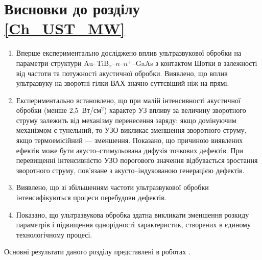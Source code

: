 \documentclass[a4paper,14pt,oneside,openany]{memoir}
\begin{document}
\section*{Висновки до розділу \ref{Ch_UST_MW}}
  \begin{enumerate}
     \item Вперше експериментально досліджено вплив ультразвукової обробки на параметри структури Au--TiB$_x$--$n$--$n^+$--GaAs з контактом Шотки
 в залежності від частоти та потужності акустичної обробки.
Виявлено, що вплив ультразвуку на зворотні гілки ВАХ значно суттєвіший ніж на прямі.

\item Експериментально встановлено, що при малій інтенсивності акустичної обробки (менше 2,5~Вт/см$^2$) характер УЗ впливу за величину зворотного струму залежить від механізму перенесення заряду:
  якщо домінуючим механізмом є тунельний, то УЗО викликає зменшення зворотного струму, якщо термоемісійний --- зменшення.
  Показано, що причиною виявлених ефектів може бути акусто--стимульована дифузія точкових дефектів.
  При перевищенні інтенсивністю УЗО порогового значення відбувається зростання зворотного струму, пов'язане з акусто--індукованою генерацією дефектів.

\item Виявлено, що зі збільшенням частоти ультразвукової обробки інтенсифікуються процеси перебудови дефектів.

\item Показано, що ультразвукова обробка здатна викликати зменшення розкиду параметрів і підвищення однорідності характеристик, створених в єдиному технологічному процесі.
  \end{enumerate}	

Основні результати даного розділу представлені в роботах \cite{Olikh:SPQEO2003,Olikh:PJE2004,Olikh:PhChOM2005,Olikh:PZTF2006,Gorb2010,
3Tomsk,50IUFFC,9APTTE,ICU2007GA,6DrogGorb}.



\end{document}

